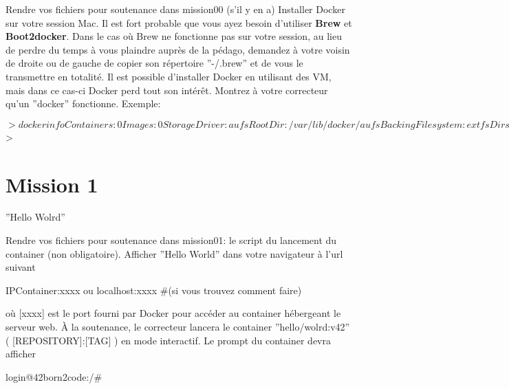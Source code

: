 \documentclass{42}
\begin{document}
Rendre vos fichiers pour soutenance dans mission00 (s’il y en a)
\newline
\newline
Installer Docker sur votre session Mac. Il est fort probable que vous ayez besoin d’utiliser \textbf{Brew} et \textbf{Boot2docker}.
\newline
\newline
Dans le cas où Brew ne fonctionne pas sur votre session, au lieu de perdre du temps à vous plaindre auprès de la pédago, demandez à votre voisin de droite ou de gauche de copier son répertoire ''-/.brew'' et de vous le transmettre en totalité.
\newline
\newline
Il est possible d’installer Docker en utilisant des VM, mais dans ce cas-ci Docker perd tout son intérêt.
\newline
\newline
Montrez à votre correcteur qu’un ''docker'' fonctionne.
\newline
\newline
Exemple:
\begin{42console}
$> docker info
Containers: 0
Images: 0
Storage Driver: aufs
 Root Dir: /var/lib/docker/aufs
 Backing Filesystem: extfs
 Dirs: 0
Execution Driver: native-0.2
Kernel Version: 3.16.0-30-generic
Operating System: Ubuntu 14.10
CPUs: 2
Total Memory: 3.633 GiB
Name: ubuntu
ID: PDDP:L64U:RQBT:G5ET:TEAC:XIJK:7JMR:ZVJW:NWU3:JMMD:YV36:WRUM
WARNING: No swap limit support
$>
\end{42console}

	\newpage

\section{Mission 1}
\begin{center}
	{\Huge ''Hello Wolrd''}
\end{center}

Rendre vos fichiers pour soutenance dans mission01: le script du lancement du container (non obligatoire).
\newline
\newline
Afficher ''Hello World'' dans votre navigateur à l’url suivant
\begin{42console}
IPContainer:xxxx ou localhost:xxxx #(si vous trouvez comment faire)
\end{42console}
où [xxxx] est le port fourni par Docker pour accéder au container hébergeant le serveur web.
\newline
\newline
À la soutenance, le correcteur lancera le container ''hello/wolrd:v42'' ( [REPOSITORY]:[TAG] ) en mode interactif. Le prompt du container devra afficher
\begin{42console}
login@42born2code:/#
\end{42console}
\end{document}
